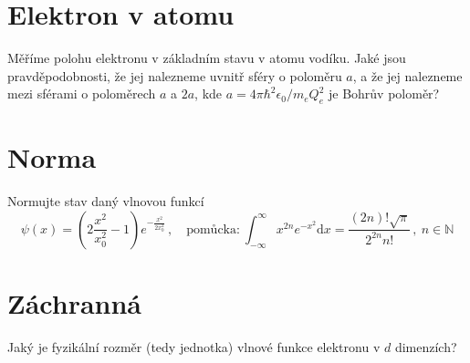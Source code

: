 \documentclass[10pt,a4paper,landscape]{article}
\begin{document}
\begin{multicols}{2}[]
\section{Elektron v atomu}
Měříme polohu elektronu v základním stavu v atomu vodíku. Jaké jsou pravděpodobnosti, že jej nalezneme uvnitř sféry o poloměru $a$, a že jej nalezneme mezi sférami o poloměrech $a$ a $2a$, kde $a = 4\pi\hbar^2\epsilon_0/m_eQ_e^2$ je Bohrův poloměr?

\section{Norma}
Normujte stav daný vlnovou funkcí
\begin{equation}
\psi\left(x\right) = \left(2\frac{x^2}{x_0^2} - 1\right)e^{-\frac{x^2}{2x_0^2}} \,,\quad\text{pomůcka:}~\int_{-\infty}^\infty x^{2n}e^{-x^2}\mathrm{d}x = \frac{\left(2n\right)!\sqrt{\pi}}{2^{2n}n!}\,,~ n\in\mathbb{N}
\end{equation}

\section{Záchranná}
Jaký je fyzikální rozměr (tedy jednotka) vlnové funkce elektronu v $d$ dimenzích?


\end{multicols}
\end{document}
